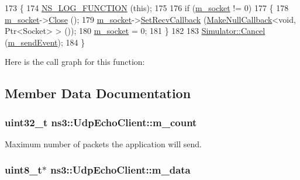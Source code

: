 \begin{DoxyCode}
173 \{
174   \hyperlink{log-macros-disabled_8h_a90b90d5bad1f39cb1b64923ea94c0761}{NS\_LOG\_FUNCTION} (\textcolor{keyword}{this});
175 
176   \textcolor{keywordflow}{if} (\hyperlink{classns3_1_1UdpEchoClient_a3742503e4126bff0e0498ffdf7d84533}{m\_socket} != 0) 
177     \{
178       \hyperlink{classns3_1_1UdpEchoClient_a3742503e4126bff0e0498ffdf7d84533}{m\_socket}->\hyperlink{classns3_1_1Socket_abdac6e2498c5aa2963ef361d4200ddf3}{Close} ();
179       \hyperlink{classns3_1_1UdpEchoClient_a3742503e4126bff0e0498ffdf7d84533}{m\_socket}->\hyperlink{classns3_1_1Socket_a243f7835ef1a85f9270fd3577e3a40da}{SetRecvCallback} (\hyperlink{group__makenullcallback_ga7e3cd6816f63ea9112c04b0086c2c65a}{MakeNullCallback}<\textcolor{keywordtype}{void}, Ptr<Socket> 
      > ());
180       \hyperlink{classns3_1_1UdpEchoClient_a3742503e4126bff0e0498ffdf7d84533}{m\_socket} = 0;
181     \}
182 
183   \hyperlink{classns3_1_1Simulator_a1b903a62d6117ef28f7ba3c6500689bf}{Simulator::Cancel} (\hyperlink{classns3_1_1UdpEchoClient_a593a5c30ddbb9b8ad69d86c7b466f9db}{m\_sendEvent});
184 \}
\end{DoxyCode}


Here is the call graph for this function\+:




\subsection{Member Data Documentation}
\subsubsection[{\texorpdfstring{m\+\_\+count}{m_count}}]{\setlength{\rightskip}{0pt plus 5cm}uint32\+\_\+t ns3\+::\+Udp\+Echo\+Client\+::m\+\_\+count\hspace{0.3cm}{\ttfamily [private]}}\hypertarget{classns3_1_1UdpEchoClient_a710824f60e09811300bd9196bd858ba1}{}\label{classns3_1_1UdpEchoClient_a710824f60e09811300bd9196bd858ba1}


Maximum number of packets the application will send. 

\subsubsection[{\texorpdfstring{m\+\_\+data}{m_data}}]{\setlength{\rightskip}{0pt plus 5cm}uint8\+\_\+t$\ast$ ns3\+::\+Udp\+Echo\+Client\+::m\+\_\+data\hspace{0.3cm}{\ttfamily [private]}}\hypertarget{classns3_1_1UdpEchoClient_a960048a7dc6bd0bae92a4ff7aa4d148b}{}\label{classns3_1_1UdpEchoClient_a960048a7dc6bd0bae92a4ff7aa4d148b}


